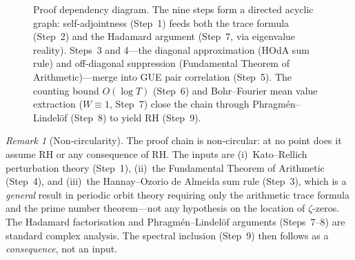 \documentclass[11pt,a4paper]{article}
\theoremstyle{plain}
\theoremstyle{remark}
\newtheorem{remark}[theorem]{Remark}
\begin{document}
\begin{figure}[htbp]
\centering
{}
\caption{Proof dependency diagram.  The nine steps form a directed acyclic graph: self-adjointness (Step~1) feeds both the trace formula (Step~2) and the Hadamard argument (Step~7, via eigenvalue reality).  Steps~3 and 4---the diagonal approximation (HOdA sum rule) and off-diagonal suppression (Fundamental Theorem of Arithmetic)---merge into GUE pair correlation (Step~5).  The counting bound $O(\log T)$ (Step~6) and Bohr--Fourier mean value extraction ($W\!\equiv\!1$, Step~7) close the chain through Phragm\'en--Lindel\"of (Step~8) to yield RH (Step~9).}
\label{fig:proof-chain}
\end{figure}

\begin{remark}[Non-circularity]
\label{rem:non-circularity}
The proof chain is non-circular: at no point does it assume RH or any
consequence of RH.  The inputs are (i)~Kato--Rellich perturbation theory
(Step~1), (ii)~the Fundamental Theorem of Arithmetic (Step~4), and
(iii)~the Hannay--Ozorio de Almeida sum rule (Step~3), which is a
\emph{general} result in periodic orbit theory requiring only the
arithmetic trace formula and the prime number theorem---not any hypothesis
on the location of $\zeta$-zeros.  The Hadamard factorisation and
Phragm\'en--Lindel\"of arguments (Steps~7--8) are standard complex
analysis.  The spectral inclusion (Step~9) then follows as a
\emph{consequence}, not an input.
\end{remark}
\end{document}
